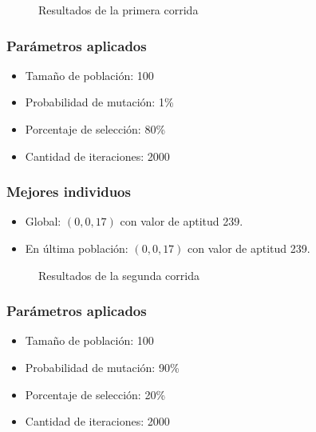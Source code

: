 \documentclass{conaiisi}
\begin{document}
\begin{figure}[h!]
\centering
{}
\caption{Resultados de la primera corrida}
\end{figure}

\newpage

\subsubsection*{Parámetros aplicados}

\begin{multicols}{2}
\begin{itemize}
	\item Tamaño de población: 100
	\item Probabilidad de mutación: 1\%
	\item Porcentaje de selección: 80\%
	\item Cantidad de iteraciones: 2000
\end{itemize}
\end{multicols}

\subsubsection*{Mejores individuos}
\begin{itemize}
	\item Global: $(0, 0, 17)$ con valor de aptitud 239.
	\item En última población: $(0, 0, 17)$ con valor de aptitud 239.
\end{itemize}

\begin{figure}[h!]
\centering
{}
\caption{Resultados de la segunda corrida}
\end{figure}


\newpage

\subsubsection*{Parámetros aplicados}

\begin{multicols}{2}
\begin{itemize}
	\item Tamaño de población: 100
	\item Probabilidad de mutación: 90\%
	\item Porcentaje de selección: 20\%
	\item Cantidad de iteraciones: 2000
\end{itemize}
\end{multicols}
\end{document}
